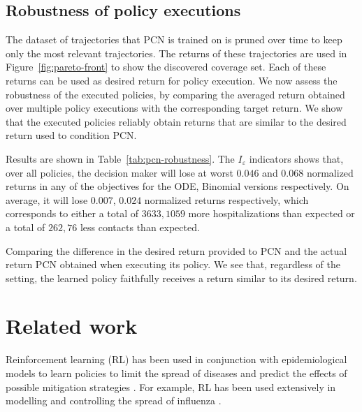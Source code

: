 \documentclass{article}
\renewcommand{\cite}[1]{\citep{#1}}
\begin{document}
\subsection{Robustness of policy executions}
\label{sec:pcn-robustness}

The dataset of trajectories that PCN is trained on is pruned over time to keep only the most relevant trajectories. The returns of these trajectories are used in Figure~\ref{fig:pareto-front} to show the discovered coverage set. Each of these returns can be used as desired return for policy execution. We now assess the robustness of the executed policies, by comparing the averaged return obtained over multiple policy executions with the corresponding target return. We show that the executed policies reliably obtain returns that are similar to the desired return used to condition PCN.

Results are shown in Table~\ref{tab:pcn-robustness}. The $I_\varepsilon$ indicators shows that, over all policies, the decision maker will lose at worst $0.046$ and $0.068$ normalized returns in any of the objectives for the ODE, Binomial versions respectively. On average, it will lose $0.007$, $0.024$ normalized returns respectively, which corresponds to either a total of $3633, 1059$ more hospitalizations than expected or a total of $262, 76$ less contacts than expected.

\begin{table}[t]
    \centering
    \setlength{\tabcolsep}{0.5em} %
    {\renewcommand{\arraystretch}{1.2}%
    
    }
    \caption{Comparing the difference in the desired return provided to PCN and the actual return PCN obtained when executing its policy. We see that, regardless of the setting, the learned policy faithfully receives a return similar to its desired return.}
    \label{tab:pcn-robustness}
\end{table}

\section{Related work}
Reinforcement learning (RL) has been used in conjunction with epidemiological models to learn policies to limit the spread of diseases and predict the effects of possible mitigation strategies \cite{probert2019context,ernst2006clinical}. For example, RL has been used extensively in modelling and controlling the spread of influenza \cite{das2008large,libin2020,libin2018bayesian}.
 
\end{document}

